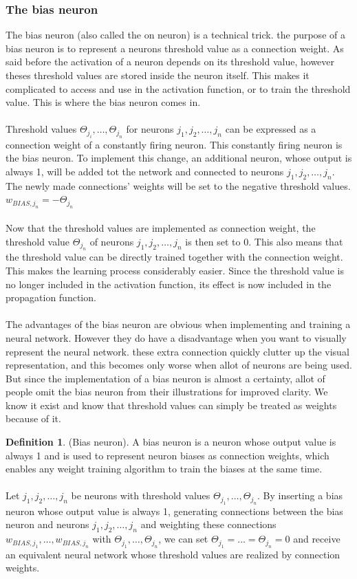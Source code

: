 \documentclass[pdftex,a4paper,12pt,twoside]{report}
\theoremstyle{plain} \newtheorem{theorem}{Theorem} \newtheorem{proposition}{Proposition} \newtheorem{lemma}{Lemma} \newtheorem*{corollary}{Corollary}
\theoremstyle{definition} \newtheorem{definition}{Definition} \newtheorem{conjecture}{Conjecture} \newtheorem*{example}{Example} \newtheorem{algorithm}{Algorithm}
\theoremstyle{remark} \newtheorem*{remark}{Remark} \newtheorem*{note}{Note} \newtheorem{case}{Case}
\begin{document}
\subsubsection{The bias neuron}
\label{subsubsec:biasneuron}
The bias neuron (also called the on neuron) is a technical trick. the purpose of a bias neuron is to represent a neurons threshold value as a connection weight. As said before the activation of a neuron depends on its threshold value, however theses threshold values are stored inside the neuron itself. This makes it complicated to access and use in the activation function, or to train the threshold value. This is where the bias neuron comes in.\\\\Threshold values $\Theta_{j_{i}}, \dotsc ,\Theta_{j_{n}}$ for neurons $j_1,j_2, \dotsc ,j_n$ can be expressed as a connection weight of a constantly firing neuron. This constantly firing neuron is the bias neuron. To implement this change, an additional neuron, whose output is always 1, will be added tot the network and connected to neurons $j_1,j_2, \dotsc ,j_n$. The newly made connections' weights will be set to the negative threshold values. $w_{BIAS,j_{n}} = - \Theta_{j_{n}}$\\\\Now that the threshold values are implemented as connection weight, the threshold value $\Theta_{j_{n}}$ of neurons $j_1,j_2, \dotsc ,j_n$ is then set to 0. This also means that the threshold value can be directly trained together with the connection weight. This makes the learning process considerably easier. Since the threshold value is no longer included in the activation function, its effect is now included in the propagation function.\\\\The advantages of the bias neuron are obvious when implementing and training a neural network. However they do have a disadvantage when you want to visually represent the neural network. these extra connection quickly clutter up the visual representation, and this becomes only worse when allot of neurons are being used. But since the implementation of a bias neuron is almost a certainty, allot of people omit the bias neuron from their illustrations for improved clarity. We know it exist and know that threshold values can simply be treated as weights because of it.
\begin{definition}
(Bias neuron). A bias neuron is a neuron whose output value is always 1 and is used to represent neuron biases as connection weights, which enables any weight training algorithm to train the biases at the same time.\\\\Let $j_1,j_2, \dotsc ,j_n$ be neurons with threshold values $\Theta_{j_{1}}, \dotsc ,\Theta_{j_{n}}$. By inserting a bias neuron whose output value is always 1, generating connections between the bias neuron and neurons $j_1,j_2, \dotsc ,j_n$ and weighting these connections $w_{BIAS,j_{1}},\dotsc,w_{BIAS,j_{n}}$ with $\Theta_{j_{1}}, \dotsc ,\Theta_{j_{n}}$, we can set $\Theta_{j_{1}}= \ldots = \Theta_{j_{n}} = 0$ and receive an equivalent neural network whose threshold values are realized by connection weights.
\end{definition}
\end{document}
